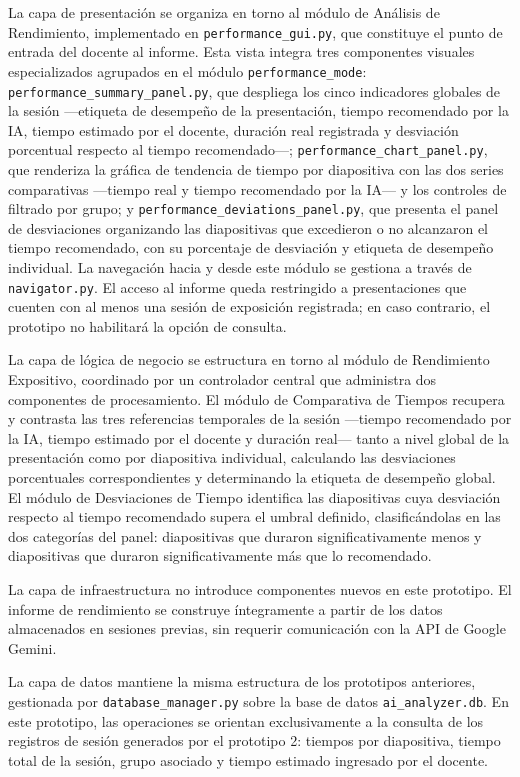 \documentclass[11pt]{article}
\begin{document}
La capa de presentación se organiza en torno al módulo de Análisis de Rendimiento, implementado en \texttt{performance\_gui.py}, que constituye el punto de entrada del docente al informe. Esta vista integra tres componentes visuales especializados agrupados en el módulo \texttt{performance\_mode}: \texttt{performance\_\allowbreak summary\_\allowbreak panel.py}, que despliega los cinco indicadores globales de la sesión ---etiqueta de desempeño de la presentación, tiempo recomendado por la IA, tiempo estimado por el docente, duración real registrada y desviación porcentual respecto al tiempo recomendado---; \texttt{performance\_chart\_panel.py}, que renderiza la gráfica de tendencia de tiempo por diapositiva con las dos series comparativas ---tiempo real y tiempo recomendado por la IA--- y los controles de filtrado por grupo; y \texttt{performance\_\allowbreak deviations\_\allowbreak panel.py}, que presenta el panel de desviaciones organizando las diapositivas que excedieron o no alcanzaron el tiempo recomendado, con su porcentaje de desviación y etiqueta de desempeño individual. La navegación hacia y desde este módulo se gestiona a través de \texttt{navigator.py}. El acceso al informe queda restringido a presentaciones que cuenten con al menos una sesión de exposición registrada; en caso contrario, el prototipo no habilitará la opción de consulta.

La capa de lógica de negocio se estructura en torno al módulo de Rendimiento Expositivo, coordinado por un controlador central que administra dos componentes de procesamiento. El módulo de Comparativa de Tiempos recupera y contrasta las tres referencias temporales de la sesión ---tiempo recomendado por la IA, tiempo estimado por el docente y duración real--- tanto a nivel global de la presentación como por diapositiva individual, calculando las desviaciones porcentuales correspondientes y determinando la etiqueta de desempeño global. El módulo de Desviaciones de Tiempo identifica las diapositivas cuya desviación respecto al tiempo recomendado supera el umbral definido, clasificándolas en las dos categorías del panel: diapositivas que duraron significativamente menos y diapositivas que duraron significativamente más que lo recomendado.

La capa de infraestructura no introduce componentes nuevos en este prototipo. El informe de rendimiento se construye íntegramente a partir de los datos almacenados en sesiones previas, sin requerir comunicación con la API de Google Gemini.

La capa de datos mantiene la misma estructura de los prototipos anteriores, gestionada por \texttt{database\_manager.py} sobre la base de datos \texttt{ai\_analyzer.db}. En este prototipo, las operaciones se orientan exclusivamente a la consulta de los registros de sesión generados por el prototipo 2: tiempos por diapositiva, tiempo total de la sesión, grupo asociado y tiempo estimado ingresado por el docente.
\end{document}
